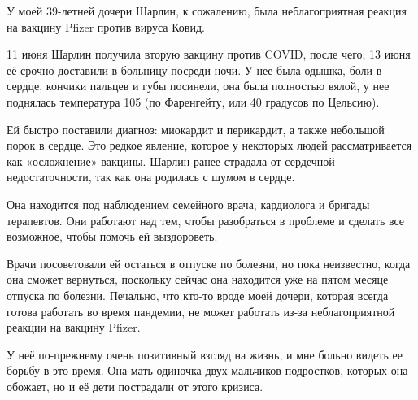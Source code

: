 У моей 39-летней дочери Шарлин, к сожалению, была неблагоприятная реакция на
вакцину Pfizer против вируса Ковид.

11 июня Шарлин получила вторую вакцину против COVID, после чего, 13 июня её
срочно доставили в больницу посреди ночи. У нее была одышка, боли в сердце,
кончики пальцев и губы посинели, она была полностью вялой, у нее поднялась
температура 105 (по Фаренгейту, или 40 градусов по Цельсию).

Ей быстро поставили диагноз: миокардит и перикардит, а также небольшой порок в
сердце. Это редкое явление, которое у некоторых людей рассматривается как
«осложнение» вакцины. Шарлин ранее страдала от сердечной недостаточности, так
как она родилась с шумом в сердце.

Она находится под наблюдением семейного врача, кардиолога и бригады
терапевтов. Они работают над тем, чтобы разобраться в проблеме и сделать все
возможное, чтобы помочь ей выздороветь.

Врачи посоветовали ей остаться в отпуске по болезни, но пока неизвестно, когда
она сможет вернуться, поскольку сейчас она находится уже на пятом месяце отпуска
по болезни. Печально, что кто-то вроде моей дочери, которая всегда готова
работать во время пандемии, не может работать из-за неблагоприятной реакции на
вакцину Pfizer.

У неё по-прежнему очень позитивный взгляд на жизнь, и мне больно видеть ее
борьбу в это время. Она мать-одиночка двух мальчиков-подростков, которых она
обожает, но и её дети пострадали от этого кризиса.
